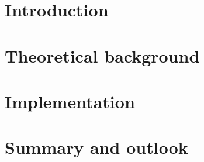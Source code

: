 \single{\documentclass[12pt,a4paper,oneside,german,english]{book}}
\begin{document}
%

\newpage
\tableofcontents

\mainmatter

\chapter{Introduction}
\label{chap:intro}


\chapter{Theoretical background}
\label{chap:theory}


\chapter{Implementation}
\label{chap:implementation}


% 

\chapter{Summary and outlook}
\label{chap:summary}

\end{document}
